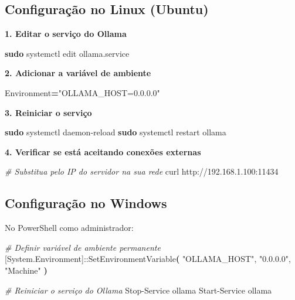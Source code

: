 \documentclass[
]{article}
\newenvironment{Shaded}{\begin{snugshade}}{\end{snugshade}}
\newcommand{\CommentTok}[1]{\textcolor[rgb]{0.56,0.35,0.01}{\textit{#1}}}
\newcommand{\ErrorTok}[1]{\textcolor[rgb]{0.64,0.00,0.00}{\textbf{#1}}}
\newcommand{\ExtensionTok}[1]{#1}
\newcommand{\FunctionTok}[1]{\textcolor[rgb]{0.13,0.29,0.53}{\textbf{#1}}}
\newcommand{\KeywordTok}[1]{\textcolor[rgb]{0.13,0.29,0.53}{\textbf{#1}}}
\newcommand{\NormalTok}[1]{#1}
\newcommand{\OperatorTok}[1]{\textcolor[rgb]{0.81,0.36,0.00}{\textbf{#1}}}
\newcommand{\StringTok}[1]{\textcolor[rgb]{0.31,0.60,0.02}{#1}}
\newcommand{\VariableTok}[1]{\textcolor[rgb]{0.00,0.00,0.00}{#1}}
\begin{document}
\subsection{Configuração no Linux
(Ubuntu)}\label{configurauxe7uxe3o-no-linux-ubuntu}

\textbf{1. Editar o serviço do Ollama}

\begin{Shaded}
\begin{Highlighting}[]
\FunctionTok{sudo}\NormalTok{ systemctl edit ollama.service}
\end{Highlighting}
\end{Shaded}

\textbf{2. Adicionar a variável de ambiente}

\begin{Shaded}
\begin{Highlighting}[]
\ExtensionTok{[Service]}
\VariableTok{Environment}\OperatorTok{=}\StringTok{"OLLAMA\_HOST=0.0.0.0"}
\end{Highlighting}
\end{Shaded}

\textbf{3. Reiniciar o serviço}

\begin{Shaded}
\begin{Highlighting}[]
\FunctionTok{sudo}\NormalTok{ systemctl daemon{-}reload}
\FunctionTok{sudo}\NormalTok{ systemctl restart ollama}
\end{Highlighting}
\end{Shaded}

\textbf{4. Verificar se está aceitando conexões externas}

\begin{Shaded}
\begin{Highlighting}[]
\CommentTok{\# Substitua pelo IP do servidor na sua rede}
\ExtensionTok{curl}\NormalTok{ http://192.168.1.100:11434}
\end{Highlighting}
\end{Shaded}

\subsection{Configuração no
Windows}\label{configurauxe7uxe3o-no-windows}

No PowerShell como administrador:

\begin{Shaded}
\begin{Highlighting}[]
\CommentTok{\# Definir variável de ambiente permanente}
\ExtensionTok{[System.Environment]::SetEnvironmentVariable}\ErrorTok{(}
  \StringTok{"OLLAMA\_HOST"}\ExtensionTok{,}
  \StringTok{"0.0.0.0"}\ExtensionTok{,}
  \StringTok{"Machine"}
\KeywordTok{)}

\CommentTok{\# Reiniciar o serviço do Ollama}
\ExtensionTok{Stop{-}Service}\NormalTok{ ollama}
\ExtensionTok{Start{-}Service}\NormalTok{ ollama}
\end{Highlighting}
\end{Shaded}
\end{document}
